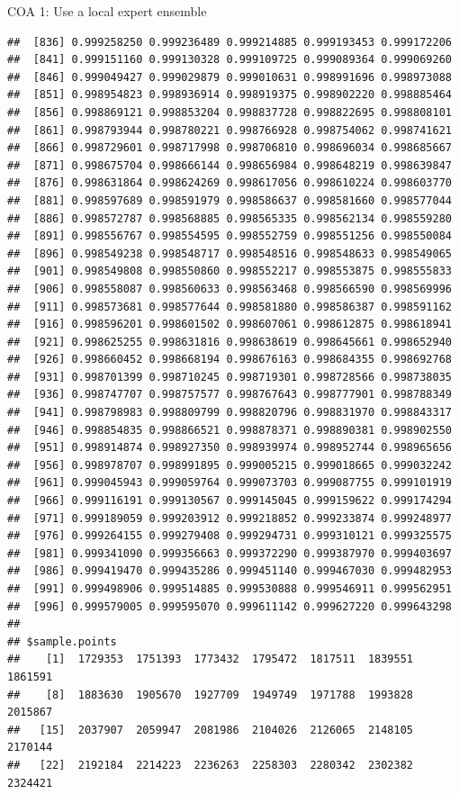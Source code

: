\documentclass[ignorenonframetext,]{beamer}
\begin{document}
\begin{frame}[fragile]{COA 1: Use a local expert ensemble}
\begin{verbatim}
##  [836] 0.999258250 0.999236489 0.999214885 0.999193453 0.999172206
##  [841] 0.999151160 0.999130328 0.999109725 0.999089364 0.999069260
##  [846] 0.999049427 0.999029879 0.999010631 0.998991696 0.998973088
##  [851] 0.998954823 0.998936914 0.998919375 0.998902220 0.998885464
##  [856] 0.998869121 0.998853204 0.998837728 0.998822695 0.998808101
##  [861] 0.998793944 0.998780221 0.998766928 0.998754062 0.998741621
##  [866] 0.998729601 0.998717998 0.998706810 0.998696034 0.998685667
##  [871] 0.998675704 0.998666144 0.998656984 0.998648219 0.998639847
##  [876] 0.998631864 0.998624269 0.998617056 0.998610224 0.998603770
##  [881] 0.998597689 0.998591979 0.998586637 0.998581660 0.998577044
##  [886] 0.998572787 0.998568885 0.998565335 0.998562134 0.998559280
##  [891] 0.998556767 0.998554595 0.998552759 0.998551256 0.998550084
##  [896] 0.998549238 0.998548717 0.998548516 0.998548633 0.998549065
##  [901] 0.998549808 0.998550860 0.998552217 0.998553875 0.998555833
##  [906] 0.998558087 0.998560633 0.998563468 0.998566590 0.998569996
##  [911] 0.998573681 0.998577644 0.998581880 0.998586387 0.998591162
##  [916] 0.998596201 0.998601502 0.998607061 0.998612875 0.998618941
##  [921] 0.998625255 0.998631816 0.998638619 0.998645661 0.998652940
##  [926] 0.998660452 0.998668194 0.998676163 0.998684355 0.998692768
##  [931] 0.998701399 0.998710245 0.998719301 0.998728566 0.998738035
##  [936] 0.998747707 0.998757577 0.998767643 0.998777901 0.998788349
##  [941] 0.998798983 0.998809799 0.998820796 0.998831970 0.998843317
##  [946] 0.998854835 0.998866521 0.998878371 0.998890381 0.998902550
##  [951] 0.998914874 0.998927350 0.998939974 0.998952744 0.998965656
##  [956] 0.998978707 0.998991895 0.999005215 0.999018665 0.999032242
##  [961] 0.999045943 0.999059764 0.999073703 0.999087755 0.999101919
##  [966] 0.999116191 0.999130567 0.999145045 0.999159622 0.999174294
##  [971] 0.999189059 0.999203912 0.999218852 0.999233874 0.999248977
##  [976] 0.999264155 0.999279408 0.999294731 0.999310121 0.999325575
##  [981] 0.999341090 0.999356663 0.999372290 0.999387970 0.999403697
##  [986] 0.999419470 0.999435286 0.999451140 0.999467030 0.999482953
##  [991] 0.999498906 0.999514885 0.999530888 0.999546911 0.999562951
##  [996] 0.999579005 0.999595070 0.999611142 0.999627220 0.999643298
## 
## $sample.points
##    [1]  1729353  1751393  1773432  1795472  1817511  1839551  1861591
##    [8]  1883630  1905670  1927709  1949749  1971788  1993828  2015867
##   [15]  2037907  2059947  2081986  2104026  2126065  2148105  2170144
##   [22]  2192184  2214223  2236263  2258303  2280342  2302382  2324421

\end{verbatim}
\end{frame}
\end{document}
